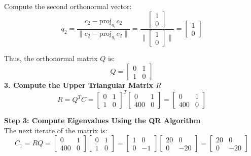 \documentclass[journal]{IEEEtran}
\begin{document}
Compute the second orthonormal vector:
\begin{equation}
    q_2 = \frac{c_2 - \text{proj}_{q_1} c_2}{\|c_2 - \text{proj}_{q_1} c_2\|} = \frac{\begin{bmatrix} 1 \\ 0 \end{bmatrix}}{\|\begin{bmatrix} 1 \\ 0 \end{bmatrix}\|} = \begin{bmatrix} 1 \\ 0 \end{bmatrix}
\end{equation}

Thus, the orthonormal matrix $Q$ is:
\begin{equation}
    Q = \begin{bmatrix} 0 & 1 \\ 1 & 0 \end{bmatrix}
\end{equation}
\textbf{3. Compute the Upper Triangular Matrix $R$} \\

\begin{equation}
    R = Q^T C = \begin{bmatrix} 0 & 1 \\ 1 & 0 \end{bmatrix}^T \begin{bmatrix} 0 & 1 \\ 400 & 0 \end{bmatrix} = \begin{bmatrix} 0 & 1 \\ 400 & 0 \end{bmatrix}
\end{equation}

\textbf{Step 3: Compute Eigenvalues Using the QR Algorithm} \\
The next iterate of the matrix is:
\begin{equation}
    C_1 = RQ = \begin{bmatrix} 0 & 1 \\ 400 & 0 \end{bmatrix} \begin{bmatrix} 0 & 1 \\ 1 & 0 \end{bmatrix} = \begin{bmatrix} 1 & 0 \\ 0 & -1 \end{bmatrix} \begin{bmatrix} 20 & 0 \\ 0 & -20 \end{bmatrix} = \begin{bmatrix} 20 & 0 \\ 0 & -20 \end{bmatrix}
\end{equation}
\end{document}
